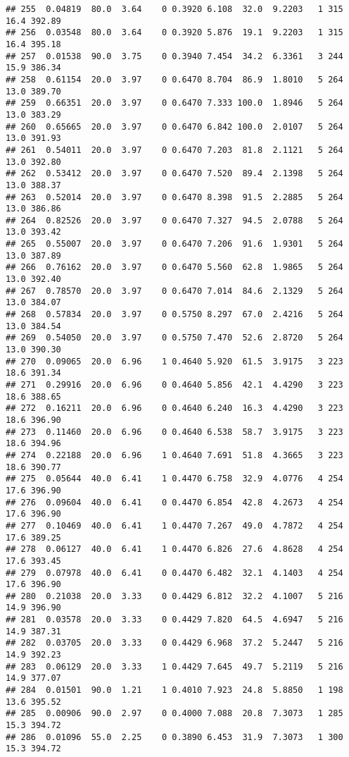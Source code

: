 \documentclass[
]{article}
\begin{document}
\begin{verbatim}
## 255  0.04819  80.0  3.64    0 0.3920 6.108  32.0  9.2203   1 315    16.4 392.89
## 256  0.03548  80.0  3.64    0 0.3920 5.876  19.1  9.2203   1 315    16.4 395.18
## 257  0.01538  90.0  3.75    0 0.3940 7.454  34.2  6.3361   3 244    15.9 386.34
## 258  0.61154  20.0  3.97    0 0.6470 8.704  86.9  1.8010   5 264    13.0 389.70
## 259  0.66351  20.0  3.97    0 0.6470 7.333 100.0  1.8946   5 264    13.0 383.29
## 260  0.65665  20.0  3.97    0 0.6470 6.842 100.0  2.0107   5 264    13.0 391.93
## 261  0.54011  20.0  3.97    0 0.6470 7.203  81.8  2.1121   5 264    13.0 392.80
## 262  0.53412  20.0  3.97    0 0.6470 7.520  89.4  2.1398   5 264    13.0 388.37
## 263  0.52014  20.0  3.97    0 0.6470 8.398  91.5  2.2885   5 264    13.0 386.86
## 264  0.82526  20.0  3.97    0 0.6470 7.327  94.5  2.0788   5 264    13.0 393.42
## 265  0.55007  20.0  3.97    0 0.6470 7.206  91.6  1.9301   5 264    13.0 387.89
## 266  0.76162  20.0  3.97    0 0.6470 5.560  62.8  1.9865   5 264    13.0 392.40
## 267  0.78570  20.0  3.97    0 0.6470 7.014  84.6  2.1329   5 264    13.0 384.07
## 268  0.57834  20.0  3.97    0 0.5750 8.297  67.0  2.4216   5 264    13.0 384.54
## 269  0.54050  20.0  3.97    0 0.5750 7.470  52.6  2.8720   5 264    13.0 390.30
## 270  0.09065  20.0  6.96    1 0.4640 5.920  61.5  3.9175   3 223    18.6 391.34
## 271  0.29916  20.0  6.96    0 0.4640 5.856  42.1  4.4290   3 223    18.6 388.65
## 272  0.16211  20.0  6.96    0 0.4640 6.240  16.3  4.4290   3 223    18.6 396.90
## 273  0.11460  20.0  6.96    0 0.4640 6.538  58.7  3.9175   3 223    18.6 394.96
## 274  0.22188  20.0  6.96    1 0.4640 7.691  51.8  4.3665   3 223    18.6 390.77
## 275  0.05644  40.0  6.41    1 0.4470 6.758  32.9  4.0776   4 254    17.6 396.90
## 276  0.09604  40.0  6.41    0 0.4470 6.854  42.8  4.2673   4 254    17.6 396.90
## 277  0.10469  40.0  6.41    1 0.4470 7.267  49.0  4.7872   4 254    17.6 389.25
## 278  0.06127  40.0  6.41    1 0.4470 6.826  27.6  4.8628   4 254    17.6 393.45
## 279  0.07978  40.0  6.41    0 0.4470 6.482  32.1  4.1403   4 254    17.6 396.90
## 280  0.21038  20.0  3.33    0 0.4429 6.812  32.2  4.1007   5 216    14.9 396.90
## 281  0.03578  20.0  3.33    0 0.4429 7.820  64.5  4.6947   5 216    14.9 387.31
## 282  0.03705  20.0  3.33    0 0.4429 6.968  37.2  5.2447   5 216    14.9 392.23
## 283  0.06129  20.0  3.33    1 0.4429 7.645  49.7  5.2119   5 216    14.9 377.07
## 284  0.01501  90.0  1.21    1 0.4010 7.923  24.8  5.8850   1 198    13.6 395.52
## 285  0.00906  90.0  2.97    0 0.4000 7.088  20.8  7.3073   1 285    15.3 394.72
## 286  0.01096  55.0  2.25    0 0.3890 6.453  31.9  7.3073   1 300    15.3 394.72

\end{verbatim}
\end{document}
